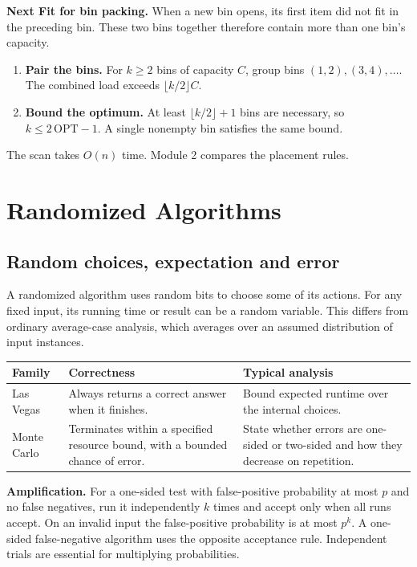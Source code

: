 \documentclass[12pt,a4paper]{article}
\begin{document}
\textbf{Next Fit for bin packing.} When a new bin opens, its first item did not fit in the preceding bin. These two bins together therefore contain more than one bin's capacity.
\begin{enumerate}[leftmargin=*, itemsep=2pt]
  \item \textbf{Pair the bins.} For $k\ge2$ bins of capacity $C$, group bins $(1,2),(3,4),\dots$. The combined load exceeds $\lfloor k/2\rfloor C$.
  \item \textbf{Bound the optimum.} At least $\lfloor k/2\rfloor+1$ bins are necessary, so $k\le2\,\mathrm{OPT}-1$. A single nonempty bin satisfies the same bound.
\end{enumerate}
The scan takes $O(n)$ time. Module 2 compares the placement rules.

\section{Randomized Algorithms}
\subsection{Random choices, expectation and error}
\begin{tcolorbox}[defbox, title={Randomized algorithm}]
A randomized algorithm uses random bits to choose some of its actions. For any fixed input, its running time or result can be a random variable. This differs from ordinary average-case analysis, which averages over an assumed distribution of input instances.
\end{tcolorbox}

\par\vspace{5pt}
\begingroup
\setlength{\extrarowheight}{1pt}
\noindent\begin{tabularx}{\linewidth}{|B{3.2cm}|Y|Y|}
\hline
\textbf{Family} & \textbf{Correctness} & \textbf{Typical analysis} \\ \hline
Las Vegas & Always returns a correct answer when it finishes. & Bound expected runtime over the internal choices. \\ \hline
Monte Carlo & Terminates within a specified resource bound, with a bounded chance of error. & State whether errors are one-sided or two-sided and how they decrease on repetition. \\ \hline
\end{tabularx}\par
\endgroup
\textbf{Amplification.} For a one-sided test with false-positive probability at most $p$ and no false negatives, run it independently $k$ times and accept only when all runs accept. On an invalid input the false-positive probability is at most $p^k$. A one-sided false-negative algorithm uses the opposite acceptance rule. Independent trials are essential for multiplying probabilities.
\end{document}
